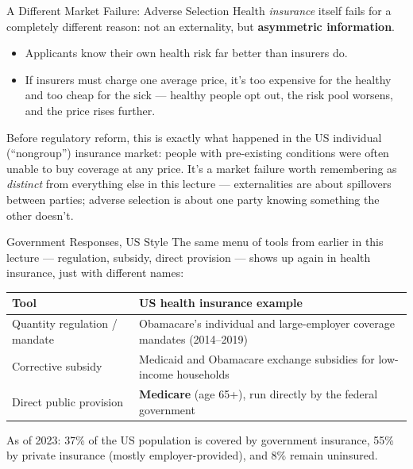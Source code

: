 \documentclass[11pt,aspectratio=169]{beamer}
\begin{document}
\begin{frame}{A Different Market Failure: Adverse Selection}
  Health \emph{insurance} itself fails for a completely different reason: not an externality, but \textbf{asymmetric information}.
  \begin{itemize}
    \item Applicants know their own health risk far better than insurers do.
    \item If insurers must charge one average price, it's too expensive for the healthy and too cheap for the sick --- healthy people opt out, the risk pool worsens, and the price rises further.
  \end{itemize}
  \vspace{0.3em}
  \small Before regulatory reform, this is exactly what happened in the US individual (``nongroup'') insurance market: people with pre-existing conditions were often unable to buy coverage at any price. It's a market failure worth remembering as \emph{distinct} from everything else in this lecture --- externalities are about spillovers between parties; adverse selection is about one party knowing something the other doesn't.
\end{frame}

\begin{frame}{Government Responses, US Style}
  The same menu of tools from earlier in this lecture --- regulation, subsidy, direct provision --- shows up again in health insurance, just with different names:
  \begin{center}
  \small
  \begin{tabular}{@{}p{3.6cm}p{7.5cm}@{}}
    \toprule
    \textbf{Tool} & \textbf{US health insurance example} \\
    \midrule
    Quantity regulation / mandate & Obamacare's individual and large-employer coverage mandates (2014--2019) \\[0.3em]
    Corrective subsidy & Medicaid and Obamacare exchange subsidies for low-income households \\[0.3em]
    Direct public provision & \textbf{Medicare} (age 65+), run directly by the federal government \\
    \bottomrule
  \end{tabular}
  \end{center}
  \vspace{0.3em}
  \small As of 2023: 37\% of the US population is covered by government insurance, 55\% by private insurance (mostly employer-provided), and 8\% remain uninsured.
\end{frame}
\end{document}
